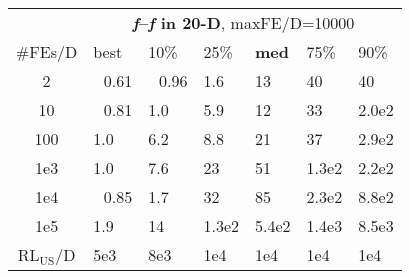 \begin{tabular}{c|llllll}
 & \multicolumn{6}{|c}{\textbf{\textit{f}\raisebox{-0.35ex}{1}--\textit{f}\raisebox{-0.35ex}{24} in 20-D}, maxFE/D=10000}\\
\#FEs/D & best & 10\% & 25\% & \textbf{med} & 75\% & 90\%\\
2 & ~\,0.61 & ~\,0.96 & \hspace*{1ex}1.6 & 13 & 40 & 40\\
10 & ~\,0.81 & \hspace*{1ex}1.0 & \hspace*{1ex}5.9 & 12 & 33 & 2.0e2\\
100 & \hspace*{1ex}1.0 & \hspace*{1ex}6.2 & \hspace*{1ex}8.8 & 21 & 37 & 2.9e2\\
1e3 & \hspace*{1ex}1.0 & \hspace*{1ex}7.6 & 23 & 51 & 1.3e2 & 2.2e2\\
1e4 & ~\,0.85 & \hspace*{1ex}1.7 & 32 & 85 & 2.3e2 & 8.8e2\\
1e5 & \hspace*{1ex}1.9 & 14 & 1.3e2 & 5.4e2 & 1.4e3 & 8.5e3\\
$\text{RL}_{\text{US}}$/D & 5e3 & 8e3 & 1e4 & 1e4 & 1e4 & 1e4
\end{tabular}
